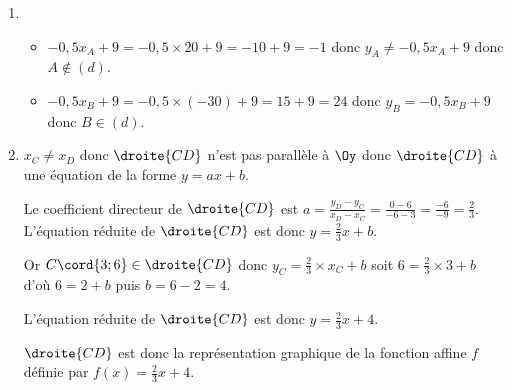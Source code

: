 %
%
%
\begin{exr}
\begin{enumerate}
\item 
    \begin{itemize}
    \item $-0,5x_A+9=-0,5\times 20 +9=-10+9=-1$ donc $y_A\neq -0,5x_A+9$ donc $A\not\in (d)$.
    \item $-0,5x_B+9=-0,5\times (-30) +9=15+9=24$ donc $y_B = -0,5x_B+9$ donc $B\in (d)$.
    \end{itemize}
\item $x_C \neq x_D$ donc $\droite{CD}$ n'est pas parallèle à $\Oy$ donc $\droite{CD}$ à une équation de la forme $y=ax+b$. 

Le coefficient directeur de $\droite{CD}$ est $a=\frac{y_D-y_C}{x_D-x_C}=\frac{0-6}{-6-3}=\frac{-6}{-9}=\frac{2}{3}$. L'équation réduite de $\droite{CD}$ est donc $y=\frac23x+b$.

Or  $C\cord{3;6}\in\droite{CD}$ donc $y_C=\frac23\times x_C + b$ soit $6 = \frac23 \times 3 + b$ d'où $6 = 2 + b$ puis $b = 6-2 = 4$.

L'équation réduite de $\droite{CD}$ est donc $y = \frac23 x + 4$.

$\droite{CD}$ est donc la représentation graphique de la fonction affine $f$ définie par $f(x)=\frac23x+4$.
\end{enumerate}
\end{exr}
\endinput
%
%
\section{\'Etude d'une fonction affine}
%
%
%
\setcounter{subsection}{1}
%
%
